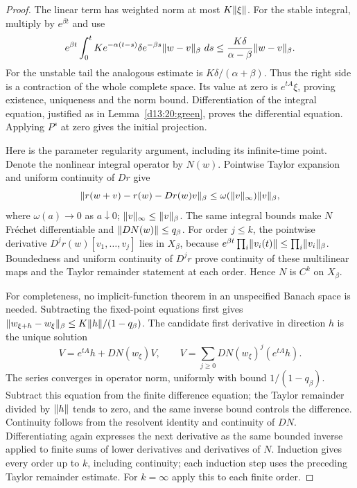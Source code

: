 \documentclass[11pt,oneside]{book}
\theoremstyle{definition}
\theoremstyle{remark}\newtheorem{remark}[theorem]{Remark}
\newcommand{\dd}{\,d}\newcommand{\id}{\operatorname{id}}
\begin{document}
\begin{proof}
The linear term has weighted norm at most $K\lVert\xi\rVert$. For the stable
integral, multiply by $e^{\beta t}$ and use
\[
 e^{\beta t}\int_0^t Ke^{-\alpha(t-s)}
       \delta e^{-\beta s}\norm{w-v}_\beta\,\dd s
 \leq\frac{K\delta}{\alpha-\beta}\norm{w-v}_\beta.
\]
For the unstable tail the analogous estimate is
$K\delta/(\alpha+\beta)$. Thus the right side is a contraction of the whole
complete space. Its value at zero is $e^{tA}\xi$, proving existence,
uniqueness and the norm bound. Differentiation of the integral equation,
justified as in Lemma~\ref{d13:20:green}, proves the differential equation.
Applying $P^s$ at zero gives the initial projection.

Here is the parameter regularity argument, including its infinite-time
point. Denote the nonlinear integral operator by $N(w)$. Pointwise Taylor
expansion and uniform continuity of $Dr$ give
\[
 \lVert r(w+v)-r(w)-Dr(w)v\rVert_\beta
 \leq\omega(\lVert v\rVert_\infty)\lVert v\rVert_\beta,
\]
where $\omega(a)\to0$ as $a\downarrow0$; $\lVert v\rVert_\infty\leq\lVert v\rVert_\beta$.
The same integral bounds make $N$ Fr\'echet differentiable and
$\lVert DN(w)\rVert\leq q_\beta$. For order $j\leq k$, the pointwise derivative
$D^j r(w)[v_1,\ldots,v_j]$ lies in $X_\beta$, because
$e^{\beta t}\prod_i\lVert v_i(t)\rVert\leq\prod_i\lVert v_i\rVert_\beta$.
Boundedness and uniform continuity of $D^j r$ prove continuity of these
multilinear maps and the Taylor remainder statement at each order. Hence
$N$ is $C^k$ on $X_\beta$.

For completeness, no implicit-function theorem in an unspecified Banach
space is needed. Subtracting the fixed-point equations first gives
$\lVert w_{\xi+h}-w_\xi\rVert_\beta\leq K\lVert h\rVert/(1-q_\beta)$.
The candidate first derivative in direction $h$ is the unique solution
\[
 V=e^{tA}h+DN(w_\xi)V,
 \qquad V=\sum_{j\geq0}DN(w_\xi)^j(e^{tA}h).
\]
The series converges in operator norm, uniformly with bound
$1/(1-q_\beta)$. Subtract this equation from the finite difference equation;
the Taylor remainder divided by $\lVert h\rVert$ tends to zero, and the same
inverse bound controls the difference. Continuity follows from the
resolvent identity and continuity of $DN$. Differentiating again expresses
the next derivative as the same bounded inverse applied to finite sums of
lower derivatives and derivatives of $N$. Induction gives every order up
to $k$, including continuity; each induction step uses the preceding
Taylor remainder estimate. For $k=\infty$ apply this to each finite order.
\end{proof}
\end{document}
